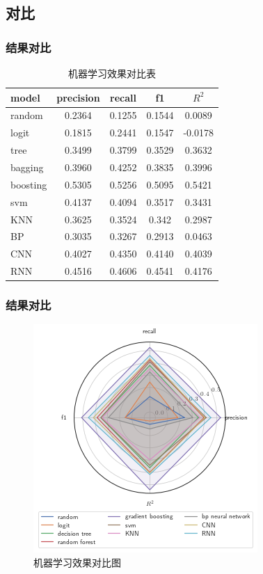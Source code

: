 \documentclass[mathserif,envcountsect,fontset=mac]{ctexbeamer}
\begin{document}
\subsection{对比}
\begin{frame}
    \frametitle{结果对比}
    \centering
    \begin{table}
        \caption{机器学习效果对比表}
        \label{result}
        \begin{tabular}{l|cccc}
            model    & precision & recall & f1     & \(R^2\) \\\hline
            random   & 0.2364    & 0.1255 & 0.1544 & 0.0089  \\
            logit    & 0.1815    & 0.2441 & 0.1547 & -0.0178 \\
            tree     & 0.3499    & 0.3799 & 0.3529 & 0.3632  \\
            bagging  & 0.3960    & 0.4252 & 0.3835 & 0.3996  \\
            boosting & 0.5305    & 0.5256 & 0.5095 & 0.5421  \\
            svm      & 0.4137    & 0.4094 & 0.3517 & 0.3431  \\
            KNN      & 0.3625    & 0.3524 & 0.342  & 0.2987  \\
            BP       & 0.3035    & 0.3267 & 0.2913 & 0.0463  \\
            CNN      & 0.4027    & 0.4350 & 0.4140 & 0.4039  \\
            RNN      & 0.4516    & 0.4606 & 0.4541 & 0.4176  \\
        \end{tabular}
    \end{table}

\end{frame}
\begin{frame}
    \frametitle{结果对比}
    \centering
    \begin{figure}
        \includegraphics[width=0.5\linewidth]{../lib/output.png}
        \caption{机器学习效果对比图}
        \label{contrast}
    \end{figure}
\end{frame}
\end{document}

